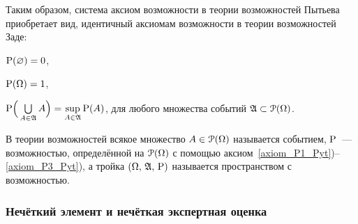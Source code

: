 Таким образом, система аксиом возможности в теории возможностей Пытьева приобретает вид, идентичный аксиомам возможности в теории возможностей Заде:
\begin{compactenum}
\item\label{axiom_P1_Pyt} $\P(\varnothing) = 0$,
\item\label{axiom_P2_Pyt} $\P(\Omega) = 1$,
\item\label{axiom_P3_Pyt} $\P\Big(\bigcup\limits_{A\in\Alg} A\Big) = \sup\limits_{A\in\Alg}\P(A)$, для любого множества событий $\Alg\subset\Po(\Omega)$.
\end{compactenum}

В теории возможностей всякое множество $A\in\Po(\Omega)$ называется событием, %
$\P$~--- возможностью, определённой на $\Po(\Omega)$ с помощью аксиом~\ref{axiom_P1_Pyt})--\ref{axiom_P3_Pyt}), а тройка $(\Omega,\, \Alg,\, \P)$ называется пространством с возможностью. %

\subsubsection{Нечёткий элемент и нечёткая экспертная оценка}

